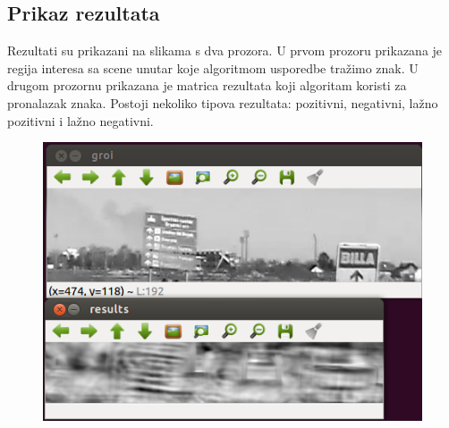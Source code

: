 \subsection{Prikaz rezultata} %
\label{sub:Prikaz rezultata}

Rezultati su prikazani na slikama s dva prozora. U prvom prozoru 
prikazana je regija interesa sa scene unutar koje algoritmom
usporedbe tražimo znak. U drugom prozornu prikazana je matrica rezultata
koji algoritam koristi za pronalazak znaka. Postoji nekoliko tipova
rezultata: pozitivni, negativni, lažno pozitivni i lažno negativni.


\begin{figure}[h]
\centering
\includegraphics[scale=0.5]{figures/01.png}
\caption{}
\label{fig:01}
\end{figure}

